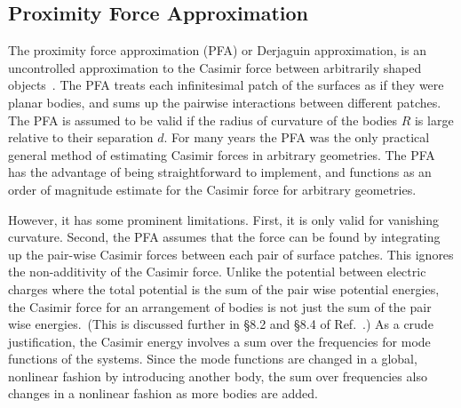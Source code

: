 \subsection{Proximity Force Approximation}
\label{sec:PFA}
The proximity force approximation (PFA) or Derjaguin approximation, is an uncontrolled approximation to
the Casimir force between arbitrarily shaped objects~\cite{Derjaguin1934,Blocki1977}.  
The PFA treats each infinitesimal patch of the surfaces as if they were planar bodies,
and sums up the pairwise interactions between different patches.
The PFA is assumed to be valid if the radius of curvature of the bodies $R$ is large relative to 
their separation $d$.  
For many years the PFA was the only practical general method of estimating Casimir forces in arbitrary geometries.
The PFA has the advantage of being straightforward to implement, and functions as an order of magnitude
estimate for the Casimir force for arbitrary geometries.

However, it has some prominent limitations.  First, it is only valid for vanishing curvature.
Second, the PFA assumes that the force can be found by integrating up
the pair-wise Casimir forces between each pair of surface patches.  This ignores the non-additivity
of the Casimir force.  Unlike the potential between electric charges where the total potential is
the sum of the pair wise potential energies, the Casimir force for an arrangement
of bodies is not just the sum of the pair wise energies.~(This is discussed further in \S{8.2} and \S{8.4} of Ref.~\cite{Milonni1994}.)
As a crude justification, the Casimir energy involves a sum over the frequencies for mode functions 
of the systems.  Since the mode functions are changed in a global, nonlinear fashion by introducing another
body, the sum over frequencies also changes in a nonlinear fashion as more bodies are added.  


